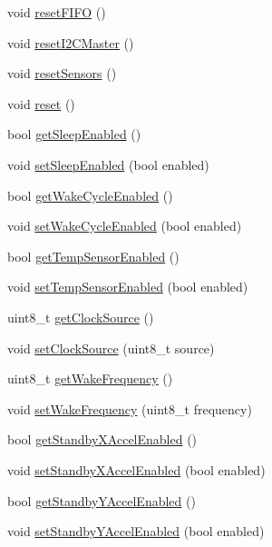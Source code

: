 \begin{DoxyCompactItemize}
\item 
void \hyperlink{classMPU6050_aafa0dc38b7ea2acd1aecd5d9df8cbd08}{reset\+F\+I\+FO} ()
\item 
void \hyperlink{classMPU6050_a96332c394f1b7efd44c83a4ff690e732}{reset\+I2\+C\+Master} ()
\item 
void \hyperlink{classMPU6050_a9a271104d3302abc4af005c69a930094}{reset\+Sensors} ()
\item 
void \hyperlink{classMPU6050_a7100b6d276c3c8664cf00d768b7b0dee}{reset} ()
\item 
bool \hyperlink{classMPU6050_a196404ef04b959083d4bf5e6f1cd8b98}{get\+Sleep\+Enabled} ()
\item 
void \hyperlink{classMPU6050_a15ec5f8e7daf235f507c1d8b96af051a}{set\+Sleep\+Enabled} (bool enabled)
\item 
bool \hyperlink{classMPU6050_a89afc5235b9088c696e2cc7841f5259a}{get\+Wake\+Cycle\+Enabled} ()
\item 
void \hyperlink{classMPU6050_a340eade71cf6286f6904c2021330944e}{set\+Wake\+Cycle\+Enabled} (bool enabled)
\item 
bool \hyperlink{classMPU6050_a31f588beab6760258212c65725eba336}{get\+Temp\+Sensor\+Enabled} ()
\item 
void \hyperlink{classMPU6050_a0113871802e88c80fe69ce1f607987ff}{set\+Temp\+Sensor\+Enabled} (bool enabled)
\item 
uint8\+\_\+t \hyperlink{classMPU6050_a8ed670258a805807b5102cdc5d0996a8}{get\+Clock\+Source} ()
\item 
void \hyperlink{classMPU6050_a4c1cd147d038e024bdeaa053c4d77734}{set\+Clock\+Source} (uint8\+\_\+t source)
\item 
uint8\+\_\+t \hyperlink{classMPU6050_a249a905ae4572a462414f2d94236258a}{get\+Wake\+Frequency} ()
\item 
void \hyperlink{classMPU6050_a62495e89f4787e6b18f0f795cef2b7cd}{set\+Wake\+Frequency} (uint8\+\_\+t frequency)
\item 
bool \hyperlink{classMPU6050_a99261a04739fdb7a9a1c5b67ce3e710e}{get\+Standby\+X\+Accel\+Enabled} ()
\item 
void \hyperlink{classMPU6050_af4df87fd2e87f41d06706cfd5bbc2a2c}{set\+Standby\+X\+Accel\+Enabled} (bool enabled)
\item 
bool \hyperlink{classMPU6050_a104f2ec438d745f8fdeec202bae09b48}{get\+Standby\+Y\+Accel\+Enabled} ()
\item 
void \hyperlink{classMPU6050_a7ce7d3299479eb66518acf0697132835}{set\+Standby\+Y\+Accel\+Enabled} (bool enabled)
\item 

\end{DoxyCompactItemize}
